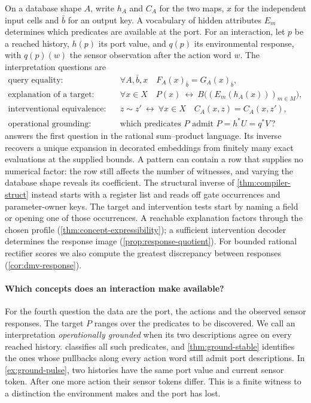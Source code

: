 \documentclass[11pt,a4paper]{article}
\theoremstyle{definition}
\theoremstyle{remark}\newaliascnt{remark}{theorem}
\numberwithin{equation}{section}
\begin{document}
On a database shape \(A\), write \(h_A\) and \(C_A\) for the two maps, \(x\) for the independent input cells and \(\bar b\) for an output key. A vocabulary of hidden attributes \(E_m\) determines which predicates are available at the port. For an interaction, let $p$ be a reached history, $h(p)$ its port value, and $q(p)$ its environmental response, with $q(p)(w)$ the sensor observation after the action word $w$. The interpretation questions are
\[
\begin{aligned}
\text{query equality:}\quad&
  \forall A,\bar b,x\quad F_A(x)_{\bar b}=G_A(x)_{\bar b},\\
\text{explanation of a target:}\quad&
  \forall x\in X\quad P(x)\ \longleftrightarrow\ B\big((E_m(h_A(x)))_{m\in M}\big),\\
\text{interventional equivalence:}\quad&
  z\sim z'\ \longleftrightarrow\ \forall x\in X\quad C_A(x,z)=C_A(x,z'),\\
\text{operational grounding:}\quad&
  \text{which predicates }P\text{ admit }P=h^*U=q^*V\,?
\end{aligned}
\]
 answers the first question in the rational sum--product language. Its inverse recovers a unique expansion in decorated embeddings from finitely many exact evaluations at the supplied bounds. A pattern can contain a row that supplies no numerical factor: the row still affects the number of witnesses, and varying the database shape reveals its coefficient. The structural inverse of \cref{thm:compiler-struct} instead starts with a register list and reads off gate occurrences and parameter-owner keys. The target and intervention tests start by naming a field or opening one of those occurrences. A reachable explanation factors through the chosen profile (\cref{thm:concept-expressibility}); a sufficient intervention decoder determines the response image (\cref{prop:response-quotient}). For bounded rational rectifier scores we also compute the greatest discrepancy between responses (\cref{cor:dmv-response}).

\paragraph{Which concepts does an interaction make available?}
For the fourth question the data are the port, the actions and the observed sensor responses. The target $P$ ranges over the predicates to be discovered. We call an interpretation \emph{operationally grounded} when its two descriptions agree on every reached history.  classifies all such predicates, and \cref{thm:ground-stable} identifies the ones whose pullbacks along every action word still admit port descriptions. In \cref{ex:ground-pulse}, two histories have the same port value and current sensor token. After one more action their sensor tokens differ. This is a finite witness to a distinction the environment makes and the port has lost.
\end{document}
